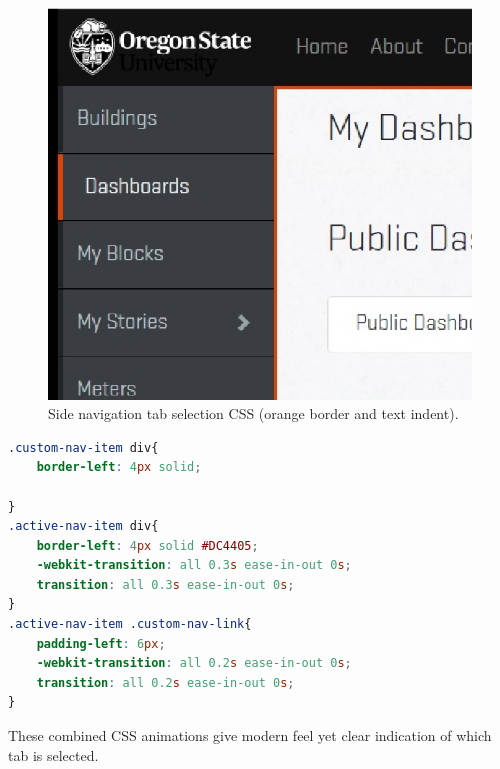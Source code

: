 \documentclass[letterpaper,10pt,serif,draftclsnofoot,onecolumn,compsoc,titlepage]{IEEEtran}
\begin{document}
	\begin{figure}[H]
		\centering
		\includegraphics[width=17cm]{images/side-nav-css.eps}
		\caption{Side navigation tab selection CSS (orange border and text indent).}
	\end{figure}
	
	\begin{lstlisting}[caption={CSS Implementation} language=CSS]
.custom-nav-item div{
    border-left: 4px solid;
	
}
.active-nav-item div{
    border-left: 4px solid #DC4405;
    -webkit-transition: all 0.3s ease-in-out 0s;
    transition: all 0.3s ease-in-out 0s;
}
.active-nav-item .custom-nav-link{
    padding-left: 6px;
	-webkit-transition: all 0.2s ease-in-out 0s;
    transition: all 0.2s ease-in-out 0s;
}
	\end{lstlisting}
	
	These combined CSS animations give modern feel yet clear indication of which tab is selected.
	
\end{document}
